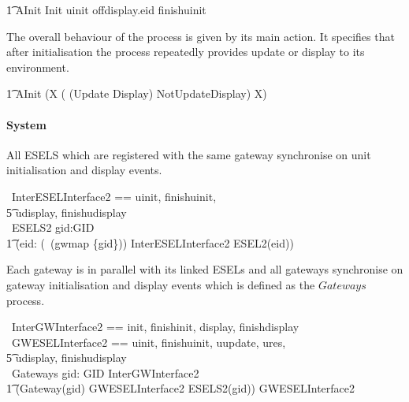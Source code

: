 \begin{circusaction}
        \t1 AInit \circdef \lschexpract Init \rschexpract \circseq uinit \then offdisplay.eid \then finishuinit \then \Skip\\
\end{circusaction}
The overall behaviour of the process is given by its main action. It specifies that after initialisation the process repeatedly provides update or display to its environment.
\begin{circusaction}
	    \t1 \circspot AInit \circseq (\circmu X \circspot ( (Update \circseq Display) \extchoice NotUpdateDisplay) \circseq X) \\
\end{circusaction}
\begin{circus}
	\circend
\end{circus}

\paragraph{System}
All ESELS which are registered with the same gateway synchronise on unit initialisation and display events.
\begin{circus}
    \circchannelset\ InterESELInterface2 == \lchanset uinit, finishuinit, \\
                \t5 udisplay, finishudisplay \rchanset \\
    \circprocess\ ESELS2 \circdef gid:GID \circspot \\ 
        \t1 (\Parallel eid: (\dom~(gwmap \rres \{gid\})) \lpar InterESELInterface2 \rpar \circspot ESEL2(eid)) \\
\end{circus}

Each gateway is in parallel with its linked ESELs and all gateways synchronise on gateway initialisation and display events which is defined as the $Gateways$ process.
\begin{circus}
    \circchannelset\ InterGWInterface2 == \lchanset init, finishinit, display, finishdisplay \rchanset \\
    \circchannelset\ GWESELInterface2 == \lchanset uinit, finishuinit, uupdate, ures, \\
                \t5 udisplay, finishudisplay \rchanset \\
    \circprocess\ Gateways \circdef \Parallel gid: GID \lpar InterGWInterface2 \rpar \circspot \\
        \t1 (Gateway(gid) \lpar GWESELInterface2 \rpar ESELS2(gid)) \circhide GWESELInterface2 \\
\end{circus}

